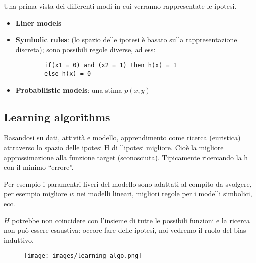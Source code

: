 Una prima vista dei differenti modi in cui verranno rappresentate le ipotesi.
\begin{itemize}
    \item \textbf{Liner models}
    \item \textbf{Symbolic rules}: (lo spazio delle ipotesi è basato sulla rappresentazione discreta); sono possibili regole diverse, ad ess:
    \begin{lstlisting}
        if(x1 = 0) and (x2 = 1) then h(x) = 1
        else h(x) = 0
    \end{lstlisting}
    \item \textbf{Probabilistic models}: una stima $p(x,y)$
\end{itemize}

\subsection{Learning algorithms}
Basandosi su dati, attività e modello, apprendimento come ricerca (euristica) attraverso lo spazio delle ipotesi H di l'ipotesi migliore.
Cioè la migliore approssimazione alla funzione target (sconosciuta). Tipicamente ricercando la h con il minimo “errore”.
\begin{example}
    Per esempio i paramentri liveri del modello sono adattati al compito da svolgere, per esempio
    migliore $w$ nei modelli lineari, migliori regole per i modelli simbolici, ecc.
\end{example}
\hspace{-15pt}$H$ potrebbe non coincidere con l'insieme di tutte le possibili funzioni e la ricerca
non può essere esaustiva: occore fare delle ipotesi, noi vedremo il ruolo del bias induttivo.
\begin{figure}[h!]
    \centering
    \texttt{[image: images/learning-algo.png]}
\end{figure}

